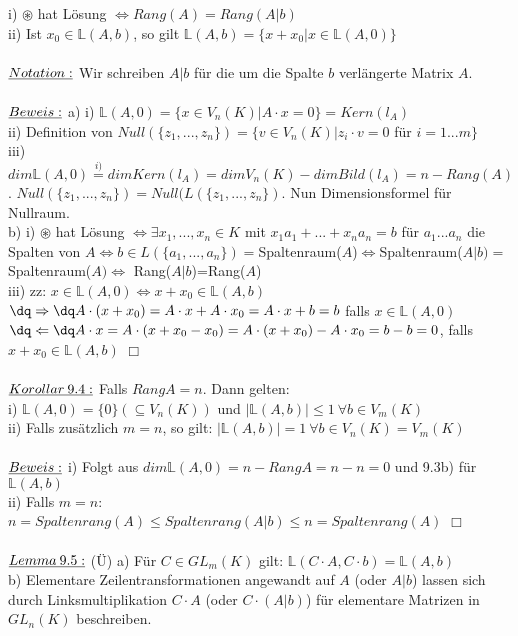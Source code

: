 \documentclass[fleqn, a4paper, 11pt]{article}
\begin{document}
i) $\circledast$ hat L\"osung $\Leftrightarrow Rang(A)=Rang(A|b)$\\
ii) Ist $x_0\in\mathbb{L}(A,b)$, so gilt $\mathbb{L}(A,b)=\{x+x_0|x\in\mathbb{L}(A,0)\}$\\
\\
$\uline{Notation:}$ Wir schreiben $A|b$ f\"ur die um die Spalte $b$ verl\"angerte Matrix $A$.\\
\\
$\uline{Beweis:}$ a) i) $\mathbb{L}(A,0)=\{x\in V_n(K)|A\cdot x=0\}=Kern(l_A)$\\
ii) Definition von $Null(\{z_1,...,z_n\})=\{v\in V_n(K)|z_i\cdot v=0$ f\"ur $i=1...m\}$\\
iii) $dim\mathbb{L}(A,0)\stackrel{i)}{=} dim Kern(l_A)=dim V_n(K)-dim Bild(l_A)=n- Rang(A)$. $Null(\{z_1,...,z_n\})=Null(L(\{z_1,...,z_n\})$. Nun Dimensionsformel f\"ur Nullraum.\\
b) i) $\circledast$ hat L\"osung $\Leftrightarrow\exists x_1,...,x_n\in K$ mit $x_1 a_1+...+x_n a_n=b$ f\"ur $a_1...a_n$ die Spalten von $A\Leftrightarrow b\in L(\{a_1,...,a_n\})=$Spaltenraum($A$)$\Leftrightarrow$Spaltenraum($A|b)=$Spaltenraum($A)\Leftrightarrow$ Rang($A|b$)=Rang($A$)\\
iii) zz: $x\in \mathbb{L}(A,0)\Leftrightarrow x+x_0\in\mathbb{L}(A,b)$\\
$\dq\Rightarrow\dq A\cdot(x+x_0)=A\cdot x+A\cdot x_0=A\cdot x+b=b$ falls $x\in\mathbb{L}(A,0)$\\
$\dq\Leftarrow\dq A\cdot x=A\cdot(x+x_0-x_0)=A\cdot(x+x_0)-A\cdot x_0=b-b=0$, falls $x+x_0\in\mathbb{L}(A,b)$ \hfill $\Box$\\
\\
$\uline{Korollar\:9.4:}$ Falls $Rang A=n$. Dann gelten:\\
i) $\mathbb{L}(A,0)=\{0\}(\subseteq V_n(K))$ und $|\mathbb{L}(A,b)|\leq 1\:\forall b\in V_m(K)$\\
ii) Falls zus\"atzlich $m=n$, so gilt: $|\mathbb{L}(A,b)|=1\:\forall b\in V_n(K)=V_m(K)$\\
\\
$\uline{Beweis:}$ i) Folgt aus $dim\mathbb{L}(A,0)=n-Rang A=n-n=0$ und 9.3b) f\"ur $\mathbb{L}(A,b)$\\
ii) Falls $m=n$: $n=Spaltenrang(A)\leq Spaltenrang(A|b)\leq n=Spaltenrang(A)$ \hfill $\Box$\\
\\
$\uline{Lemma\:9.5:}$ (\"U) a) F\"ur $C\in GL_m(K)$ gilt: $\mathbb{L}(C\cdot A,C\cdot b)=\mathbb{L}(A,b)$\\
b) Elementare Zeilentransformationen angewandt auf $A$ (oder $A|b$) lassen sich durch Linksmultiplikation $C\cdot A$ (oder $C\cdot (A|b)$) f\"ur elementare Matrizen in $GL_n(K)$ beschreiben.\\
\end{document}
